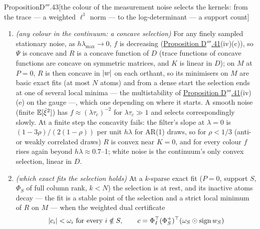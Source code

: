 \begin{thm}{Proposition}{D$'''$.43}[the colour of the measurement noise selects the kernels: from the trace --- a
weighted $\ell^1$ norm --- to the log-determinant --- a support count]
\begin{enumerate}[label=\textup{(\roman*)}]
    the sparsest exact fits, ties broken by $\det(\Phi_S^\T\Phi_S)\prod_{i\in S}\abs{w_i}$ --- asymptotically: at a
    finite $\tau_c$ an exact fit on more atoms can have the lower $R$ (numerics C). $R$ is Fazel's log-det heuristic on
    $\Phi\operatorname{diag}\abs w\Phi^\T$ --- sparse Bayesian learning's $\log\abs{\Sigma_y}$ term at
    $\gamma\propto\abs w$ and $\lambda = 1/\tau_c$, not its penalty (which minimises over $\gamma$ and adds
    $w^\T\Gamma^{-1}w$), so Wipf--Rao's results on its local minima do not transfer. The weights
    $\omega_i = \varphi_i^\T(I + \tau_cK)^{-1}\varphi_i$ are $O(1/\tau_c)$ for an atom in the span of the relevant ones
    and $\abs{\Pi^\perp\varphi_i}^2$ for an atom outside it ($\Pi^\perp$ the projection onto the complement of that
    span): the relevant atoms are spared and the others decay.
  \item \emph{(any colour in the continuum: a concave selection)} For any finely sampled stationary noise, as
    $h\lambda_{\max}\to0$, $f$ is decreasing (\hyperref[res:thmDppp:41]{Proposition D$'''$.41}(iv)(c)), so $\Psi$ is
    concave and $R$ is a concave function of $D$ (trace functions of concave functions are concave on symmetric
    matrices, and $K$ is linear in $D$); on $M$ at $P = 0$, $R$ is then concave in $\lvert w\rvert$ on each orthant, so its
    minimisers on $M$ are basic exact fits (at most $N$ atoms) and from a dense start the selection ends at one of
    several local minima --- the multistability of \hyperref[res:thmDppp:41]{Proposition D$'''$.41}(iv)(e) on the gauge
    ---, which one depending on where it starts. A smooth noise (finite $\mathbb{E}[\dot\xi^2]$) has
    $f\approx(\lambda\tau_c)^{-2}$ for $\lambda\tau_c\gg1$ and selects correspondingly slowly. At a finite step the
    concavity fails: the filter's slope at $\lambda = 0$ is $(1 - 3\rho)/(2(1 - \rho))$ per unit $h\lambda$ for AR(1)
    draws, so for $\rho < 1/3$ (anti- or weakly correlated draws) $R$ is convex near $K = 0$, and for every colour $f$
    rises again beyond $h\lambda\approx0.7$--1; white noise is the continuum's only convex selection, linear in $D$.
  \item \emph{(which exact fits the selection holds)} At a $k$-sparse exact fit ($P = 0$, support $S$, $\Phi_S$ of full
    column rank, $k < N$) the selection is at rest, and its inactive atoms decay --- the fit is a stable point of the
    selection and a strict local minimum of $R$ on $M$ --- when the weighted dual certificate
    \[
      \abs{c_i} < \omega_i\ \text{for every}\ i\notin S,\qquad
      c = \Phi_I^\T(\Phi_S^+)^\T(\omega_S\odot\operatorname{sign}w_S)
\]
\end{enumerate}
\end{thm}
